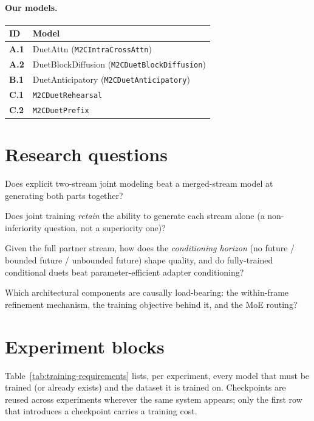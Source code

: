 \documentclass[11pt]{article}
\newcommand{\sys}[1]{\textbf{#1}}
\newcommand{\code}[1]{\texttt{#1}}
\begin{document}
\paragraph{Our models.}
\begin{center}
\begin{tabularx}{\textwidth}{@{}lL@{}}
\toprule
ID & Model \\
\midrule
\sys{A.1} & DuetAttn (\code{M2CIntraCrossAttn}) \\
\sys{A.2} & DuetBlockDiffusion (\code{M2CDuetBlockDiffusion}) \\
\sys{B.1} & DuetAnticipatory (\code{M2CDuetAnticipatory}) \\
\sys{C.1} & \code{M2CDuetRehearsal} \\
\sys{C.2} & \code{M2CDuetPrefix} \\
\bottomrule
\end{tabularx}
\end{center}

\section{Research questions}

\begin{description}[nosep]
  \item[RQ1 --- Co-generation.] Does explicit two-stream joint modeling
    beat a merged-stream model at generating both parts together?
  \item[RQ2 --- Marginals.] Does joint training \emph{retain} the
    ability to generate each stream alone (a non-inferiority question,
    not a superiority one)?
  \item[RQ3 --- Conditional generation.] Given the full partner
    stream, how does the \emph{conditioning horizon} (no future /
    bounded future / unbounded future) shape quality, and do
    fully-trained conditional duets beat parameter-efficient adapter
    conditioning?
  \item[RQ4 --- Mechanisms.] Which architectural components are
    causally load-bearing: the within-frame refinement mechanism, the
    training objective behind it, and the MoE routing?
\end{description}

\section{Experiment blocks}

Table~\ref{tab:training-requirements} lists, per experiment, every
model that must be trained (or already exists) and the dataset it is
trained on. Checkpoints are reused across experiments wherever the
same system appears; only the first row that introduces a checkpoint
carries a training cost.
\end{document}
